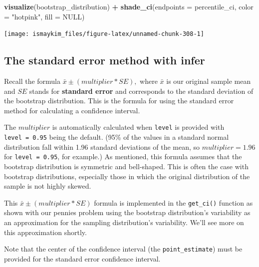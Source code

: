 \documentclass[12pt, krantz2,]{krantz}
\makeatletter
\newenvironment{Shaded}{\begin{snugshade}}{\end{snugshade}}
\newcommand{\DataTypeTok}[1]{\textcolor[rgb]{0.27,0.27,0.27}{#1}}
\newcommand{\KeywordTok}[1]{\textcolor[rgb]{0.27,0.27,0.27}{\textbf{#1}}}
\newcommand{\NormalTok}[1]{#1}
\newcommand{\OperatorTok}[1]{\textcolor[rgb]{0.43,0.43,0.43}{\textbf{#1}}}
\newcommand{\OtherTok}[1]{\textcolor[rgb]{0.37,0.37,0.37}{#1}}
\newcommand{\StringTok}[1]{\textcolor[rgb]{0.5,0.5,0.5}{#1}}
\newenvironment{kframe}{%
\medskip{}
\setlength{\fboxsep}{.8em}
 \def\at@end@of@kframe{}%
 \ifinner\ifhmode%
  \def\at@end@of@kframe{\end{minipage}}%
  \begin{minipage}{\columnwidth}%
 \fi\fi%
 \def\FrameCommand##1{\hskip\@totalleftmargin \hskip-\fboxsep
 \colorbox{shadecolor}{##1}\hskip-\fboxsep
     \hskip-\linewidth \hskip-\@totalleftmargin \hskip\columnwidth}%
 \MakeFramed {\advance\hsize-\width
   \@totalleftmargin\z@ \linewidth\hsize
   \@setminipage}}%
 {\par\unskip\endMakeFramed%
 \at@end@of@kframe}
\renewenvironment{Shaded}{\begin{kframe}}{\end{kframe}}
\makeatother
\begin{document}
\begin{Shaded}
\begin{Highlighting}[]
\KeywordTok{visualize}\NormalTok{(bootstrap_distribution) }\OperatorTok{+}\StringTok{ }
\StringTok{  }\KeywordTok{shade_ci}\NormalTok{(}\DataTypeTok{endpoints =}\NormalTok{ percentile_ci,}
           \DataTypeTok{color =} \StringTok{"hotpink"}\NormalTok{,}
           \DataTypeTok{fill =} \OtherTok{NULL}\NormalTok{)}
\end{Highlighting}
\end{Shaded}

\begin{center}\texttt{[image: ismaykim\_files/figure-latex/unnamed-chunk-308-1]} \end{center}

\hypertarget{the-standard-error-method-with-infer}{%
\subsection{The standard error method with infer}\label{the-standard-error-method-with-infer}}

Recall the formula \(\bar{x} \pm (multiplier * SE),\) where \(\bar{x}\) is our original sample mean and \(SE\) stands for \textbf{standard error} and corresponds to the standard deviation of the bootstrap distribution. This is the formula for using the standard error method for calculating a confidence interval.

The \(multiplier\) is automatically calculated when \texttt{level} is provided with \texttt{level\ =\ 0.95} being the default. (95\% of the values in a standard normal distribution fall within 1.96 standard deviations of the mean, so \(multiplier = 1.96\) for \texttt{level\ =\ 0.95}, for example.) As mentioned, this formula assumes that the bootstrap distribution is symmetric and bell-shaped. This is often the case with bootstrap distributions, especially those in which the original distribution of the sample is not highly skewed.

This \(\bar{x} \pm (multiplier * SE)\) formula is implemented in the \texttt{get\_ci()} function as shown with our pennies problem using the bootstrap distribution's variability as an approximation for the sampling distribution's variability. We'll see more on this approximation shortly.

Note that the center of the confidence interval (the \texttt{point\_estimate}) must be provided for the standard error confidence interval.

\begin{Shaded}
\end{Shaded}
\end{document}
